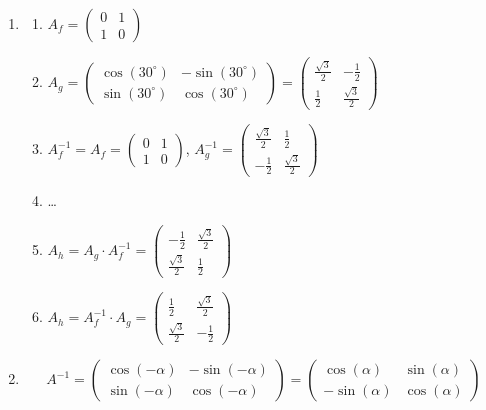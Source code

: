 \begin{enumerate}
    \item
    \begin{enumerate}
      \item \( A_f = \begin{pmatrix} 0 & 1 \\ 1 & 0 \end{pmatrix} \)
      \item \( A_g = \begin{pmatrix} \cos(30^\circ) & -\sin(30^\circ) \\ \sin(30^\circ) & \cos(30^\circ) \end{pmatrix}
              = \begin{pmatrix} \frac{\sqrt{3}}{2} & -\frac{1}{2} \\ \frac{1}{2} & \frac{\sqrt{3}}{2} \end{pmatrix} \)
      \item \( A_f^{-1} = A_f = \begin{pmatrix} 0 & 1 \\ 1 & 0 \end{pmatrix} \),
            \quad
            \( A_g^{-1} = \begin{pmatrix} \frac{\sqrt{3}}{2} & \frac{1}{2} \\ -\frac{1}{2} & \frac{\sqrt{3}}{2} \end{pmatrix} \)
      \item \dots
        \item \( A_h = A_g \cdot A_f^{-1} = \begin{pmatrix} -\frac{1}{2} & \frac{\sqrt{3}}{2} \\ \frac{\sqrt{3}}{2} & \frac{1}{2} \end{pmatrix} \)
      \item \( A_h = A_f^{-1} \cdot A_g =  \begin{pmatrix} \frac{1}{2} & \frac{\sqrt{3}}{2} \\ \frac{\sqrt{3}}{2} & -\frac{1}{2} \end{pmatrix} \)
    \end{enumerate}
    \item $$ A^{-1} = \begin{pmatrix}
        \cos(-\alpha) & -\sin(-\alpha) \\
        \sin(-\alpha) & \cos(-\alpha)
    \end{pmatrix} = \begin{pmatrix}
        \cos(\alpha) & \sin(\alpha) \\
        -\sin(\alpha) & \cos(\alpha)
    \end{pmatrix}$$
  
  \end{enumerate}

